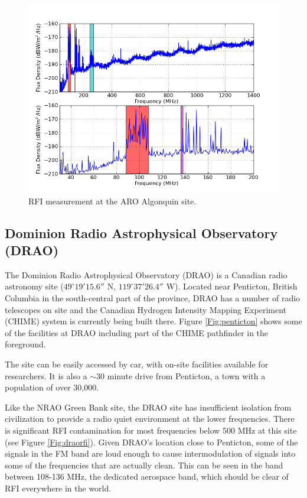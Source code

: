 \begin{figure}[tb]
\begin{center}
\includegraphics[width=0.9\linewidth]{RFI_testing/figures/ALG_bands.png}
\caption{RFI measurement at the ARO Algonquin site.}
\label{Fig:arorfi}
\end{center}
\end{figure}

\subsection{Dominion Radio Astrophysical Observatory (DRAO)}

The Dominion Radio Astrophysical Observatory (DRAO) is a Canadian radio astronomy site ($49^\circ 19' 15.6''$ N, $119^\circ 37' 26.4''$ W). Located near Penticton, British Columbia in the south-central part of the province, DRAO has a number of radio telescopes on site and the Canadian Hydrogen Intensity Mapping Experiment (CHIME) system is currently being built there. Figure \ref{Fig:penticton} shows some of the facilities at DRAO including part of the CHIME pathfinder in the foreground. 

The site can be easily accessed by car, with on-site facilities available for researchers. It is also a $\sim$30 minute drive from Penticton, a town with a population of over 30,000. 

Like the NRAO Green Bank site, the DRAO site has insufficient isolation from civilization to provide a radio quiet environment at the lower frequencies. There is significant RFI contamination for most frequencies below 500 MHz at this site (see Figure \ref{Fig:draorfi}). Given DRAO's location close to Penticton, some of the signals in the FM band are loud enough to cause intermodulation of signals into some of the frequencies that are actually clean. This can be seen in the band between 108-136 MHz, the dedicated aerospace band, which should be clear of RFI everywhere in the world. 


